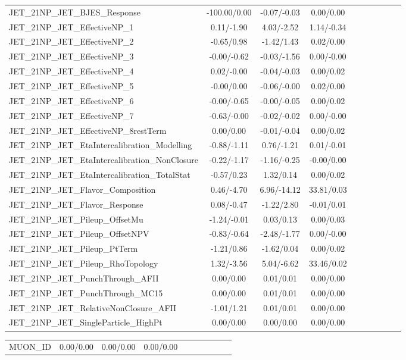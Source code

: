 \begin{table}[h]
\begin{center}
\begin{tabular}{l|ccccccccc}
JET\_21NP\_JET\_BJES\_Response &-100.00/0.00 &-0.07/-0.03 &0.00/0.00 \\
JET\_21NP\_JET\_EffectiveNP\_1 &0.11/-1.90 &4.03/-2.52 &1.14/-0.34 \\
JET\_21NP\_JET\_EffectiveNP\_2 &-0.65/0.98 &-1.42/1.43 &0.02/0.00 \\
JET\_21NP\_JET\_EffectiveNP\_3 &-0.00/-0.62 &-0.03/-1.56 &0.00/-0.00 \\
JET\_21NP\_JET\_EffectiveNP\_4 &0.02/-0.00 &-0.04/-0.03 &0.00/0.02 \\
JET\_21NP\_JET\_EffectiveNP\_5 &-0.00/0.00 &-0.06/-0.00 &0.02/0.00 \\
JET\_21NP\_JET\_EffectiveNP\_6 &-0.00/-0.65 &-0.00/-0.05 &0.00/0.02 \\
JET\_21NP\_JET\_EffectiveNP\_7 &-0.63/-0.00 &-0.02/-0.02 &0.00/-0.00 \\
JET\_21NP\_JET\_EffectiveNP\_8restTerm &0.00/0.00 &-0.01/-0.04 &0.00/0.02 \\
JET\_21NP\_JET\_EtaIntercalibration\_Modelling &-0.88/-1.11 &0.76/-1.21 &0.01/-0.01 \\
JET\_21NP\_JET\_EtaIntercalibration\_NonClosure &-0.22/-1.17 &-1.16/-0.25 &-0.00/0.00 \\
JET\_21NP\_JET\_EtaIntercalibration\_TotalStat &-0.57/0.23 &1.32/0.14 &0.00/0.02 \\
JET\_21NP\_JET\_Flavor\_Composition &0.46/-4.70 &6.96/-14.12 &33.81/0.03 \\
JET\_21NP\_JET\_Flavor\_Response &0.08/-0.47 &-1.22/2.80 &-0.01/0.01 \\
JET\_21NP\_JET\_Pileup\_OffsetMu &-1.24/-0.01 &0.03/0.13 &0.00/0.03 \\
JET\_21NP\_JET\_Pileup\_OffsetNPV &-0.83/-0.64 &-2.48/-1.77 &0.00/-0.00 \\
JET\_21NP\_JET\_Pileup\_PtTerm &-1.21/0.86 &-1.62/0.04 &0.00/0.02 \\
JET\_21NP\_JET\_Pileup\_RhoTopology &1.32/-3.56 &5.04/-6.62 &33.46/0.02 \\
JET\_21NP\_JET\_PunchThrough\_AFII &0.00/0.00 &0.01/0.01 &0.00/0.00 \\
JET\_21NP\_JET\_PunchThrough\_MC15 &0.00/0.00 &0.01/0.01 &0.00/0.00 \\
JET\_21NP\_JET\_RelativeNonClosure\_AFII &-1.01/1.21 &0.01/0.01 &0.00/0.00 \\
JET\_21NP\_JET\_SingleParticle\_HighPt &0.00/0.00 &0.00/0.00 &0.00/0.00 \\
\hline \end{tabular} \end{center} \end{table} \begin{table}[h] \scriptsize \begin{center} \begin{tabular}{l|ccccccccc} \hline MUON\_ID &0.00/0.00 &0.00/0.00 &0.00/0.00 \\

\end{tabular}
\end{center}
\end{table}
